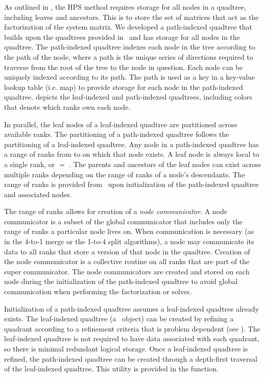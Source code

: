 As outlined in \citep{chipman2024fast}, the HPS method requires storage for all nodes in a quadtree, including leaves and ancestors. This is to store the set of matrices that act as the factorization of the system matrix. We developed a path-indexed quadtree that builds upon the quadtrees provided in \pforest\ and has storage for all nodes in the quadtree. The path-indexed quadtree indexes each node in the tree according to the path of the node, where a path is the unique series of directions required to traverse from the root of the tree to the node in question. Each node can be uniquely indexed according to its path. The path is used as a key in a key-value lookup table (i.e. map) to provide storage for each node in the path-indexed quadtree.  depicts the leaf-indexed and path-indexed quadtrees, including colors that denote which ranks own each node.

In parallel, the leaf nodes of a leaf-indexed quadtree are partitioned across available ranks. The partitioning of a path-indexed quadtree follows the partitioning of a leaf-indexed quadtree. Any node in a path-indexed quadtree has a range of ranks from \rfirst to \rlast on which that node exists. A leaf node is always local to a single rank, or \rfirst $=$ \rlast. The parents and ancestors of the leaf nodes can exist across multiple ranks depending on the range of ranks of a node's descendants. The range of ranks is provided from \pforest\ upon initialization of the path-indexed quadtree and associated nodes.

The range of ranks allows for creation of a {\em node communicator}. A node communicator is a subset of the global communicator that includes only the range of ranks a particular node lives on. When communication is necessary (as in the 4-to-1 merge or the 1-to-4 split algorithms), a node may communicate its data to all ranks that store a version of that node in the quadtree. Creation of the node communicator is a collective routine on all ranks that are part of the super communicator. The node communicators are created and stored on each node during the initialization of the path-indexed quadtree to avoid global communication when performing the factorization or solves.

Initialization of a path-indexed quadtree assumes a leaf-indexed quadtree already exists. The leaf-indexed quadtree (a \pforest\ object) can be created by refining a quadrant according to a refinement criteria that is problem dependent (see ). The leaf-indexed quadtree is not required to have data associated with each quadrant, so there is minimal redundant logical storage. Once a leaf-indexed quadtree is refined, the path-indexed quadtree can be created through a depth-first traversal of the leaf-indexed quadtree. This utility is provided in the  function.

